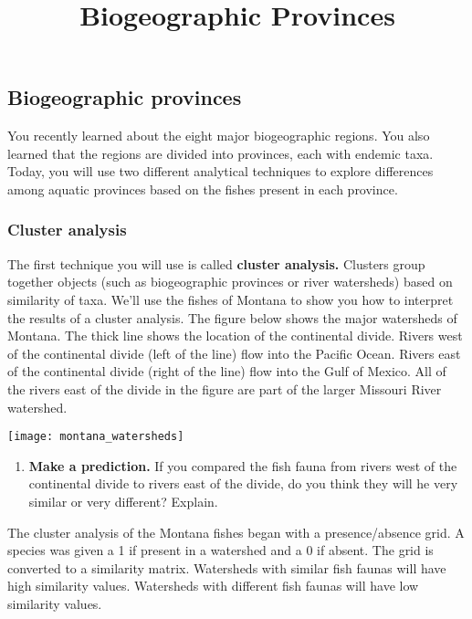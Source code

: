 \documentclass[11pt]{article}
\title{Biogeographic Provinces}
\author{}
\date{}                                           %
\begin{document}
\thispagestyle{first_page}

\subsection*{Biogeographic provinces}

You recently learned about the eight major biogeographic regions. 
You also learned that the regions are divided into provinces, each with
endemic taxa.  Today, you will use two different analytical techniques to explore 
differences among aquatic provinces based on the fishes present in each 
province.

\subsubsection*{Cluster analysis}

The first technique you will use is called \textbf{cluster analysis.} Clusters
group together objects (such as biogeographic provinces or river watersheds)
based on similarity of taxa. We'll use the fishes of Montana to show you
how to interpret the results of a cluster analysis.  The figure below shows the
major watersheds of Montana.  The thick line shows the location of the
continental divide. Rivers west of the continental divide (left of the line)
flow into the Pacific Ocean. Rivers east of the continental divide (right
of the line) flow into the Gulf of Mexico.  All of the rivers east of the divide
in the figure are part of the larger Missouri River watershed.

\begin{center}
	\texttt{[image: montana\_watersheds]}
\end{center}

\begin{enumerate}[resume]
\item \textbf{Make a prediction.} If you compared the fish fauna from 
rivers west of the continental divide  to rivers east of the divide, do you think
they will he very similar or very different? Explain.%
\end{enumerate}


\newpage

The cluster analysis of the Montana fishes began with a presence/absence
grid. A species was given a 1 if present in a watershed and a 0 if absent. 
The grid is converted to a similarity matrix. Watersheds with similar fish 
faunas will have high similarity values. Watersheds with different
fish faunas will have low similarity values.   
\end{document}
